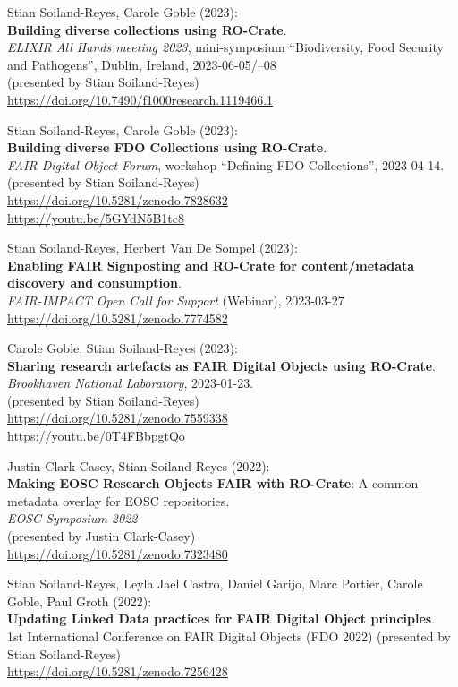 Stian Soiland-Reyes, Carole Goble (2023):\\
\textbf{Building diverse collections using RO-Crate}.\\
\emph{ELIXIR All Hands meeting 2023}, mini-symposium ``Biodiversity,
Food Security and Pathogens'', Dublin, Ireland, 2023-06-05/--08\\
(presented by Stian Soiland-Reyes)\\
\url{https://doi.org/10.7490/f1000research.1119466.1}

Stian Soiland-Reyes, Carole Goble (2023):\\
\textbf{Building diverse FDO Collections using RO-Crate}.\\
\emph{FAIR Digital Object Forum}, workshop
``Defining FDO Collections'', 2023-04-14.\\
(presented by Stian Soiland-Reyes)\\
\url{https://doi.org/10.5281/zenodo.7828632}\\
\url{https://youtu.be/5GYdN5B1tc8}

Stian Soiland-Reyes, Herbert Van De Sompel (2023):\\
\textbf{Enabling FAIR Signposting and RO-Crate for content/metadata discovery and consumption}.\\
\emph{FAIR-IMPACT Open Call for Support} (Webinar), 2023-03-27 \\
\url{https://doi.org/10.5281/zenodo.7774582}


Carole Goble, Stian Soiland-Reyes (2023):\\
\textbf{Sharing research
artefacts as FAIR Digital Objects using RO-Crate}.\\
\emph{Brookhaven National Laboratory}, 2023-01-23.\\
(presented by Stian Soiland-Reyes)\\
\url{https://doi.org/10.5281/zenodo.7559338} \\
\url{https://youtu.be/0T4FBbpgtQo}

Justin Clark-Casey, Stian Soiland-Reyes (2022):\\
\textbf{Making EOSC Research Objects FAIR with RO-Crate}: A common metadata overlay for EOSC repositories.\\
\emph{{EOSC Symposium 2022}}\\
(presented by Justin Clark-Casey)\\
\url{https://doi.org/10.5281/zenodo.7323480}

Stian Soiland-Reyes, Leyla Jael Castro, Daniel Garijo, Marc Portier,
Carole Goble, Paul Groth (2022):\\
\textbf{Updating Linked Data practices for FAIR Digital Object principles}.\\
1st International Conference on FAIR Digital Objects (FDO 2022)
(presented by Stian Soiland-Reyes)\\
\url{https://doi.org/10.5281/zenodo.7256428}

